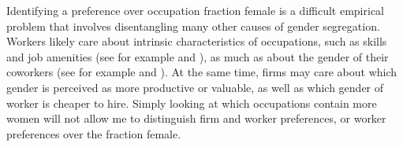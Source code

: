 \documentclass[12pt]{article}
\begin{document}



Identifying a preference over occupation fraction female is a difficult empirical problem that involves disentangling many other causes of gender segregation. Workers likely care about intrinsic characteristics of occupations, such as skills and job amenities (see for example  and ), as much as about the gender of their coworkers (see for example  and ). At the same time, firms may care about which gender is perceived as more productive or valuable, as well as which gender of worker is cheaper to hire. Simply looking at which occupations contain more women will not allow me to distinguish firm and worker preferences, or worker preferences over the fraction female.
\end{document}
